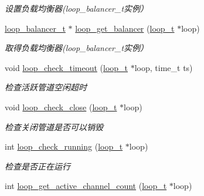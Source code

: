 \begin{DoxyCompactItemize}
\begin{DoxyCompactList}\small\item\em 设置负载均衡器(loop\+\_\+balancer\+\_\+t实例） \end{DoxyCompactList}\item 
\hyperlink{a00051_a649c7e850ab247b5f70ad27e335a129d_a649c7e850ab247b5f70ad27e335a129d}{loop\+\_\+balancer\+\_\+t} $\ast$ \hyperlink{a00069_a1f9df6866c80e91a620320298d199315_a1f9df6866c80e91a620320298d199315}{loop\+\_\+get\+\_\+balancer} (\hyperlink{a00051_a9c3ad1cd2de83e09f3a7b59fa82c94ee_a9c3ad1cd2de83e09f3a7b59fa82c94ee}{loop\+\_\+t} $\ast$loop)
\begin{DoxyCompactList}\small\item\em 取得负载均衡器(loop\+\_\+balancer\+\_\+t实例） \end{DoxyCompactList}\item 
void \hyperlink{a00069_a7a6972b39402a670659621e9fa7204ce_a7a6972b39402a670659621e9fa7204ce}{loop\+\_\+check\+\_\+timeout} (\hyperlink{a00051_a9c3ad1cd2de83e09f3a7b59fa82c94ee_a9c3ad1cd2de83e09f3a7b59fa82c94ee}{loop\+\_\+t} $\ast$loop, time\+\_\+t ts)
\begin{DoxyCompactList}\small\item\em 检查活跃管道空闲超时 \end{DoxyCompactList}\item 
void \hyperlink{a00069_a5f61cefa251961e82fbf82b1c7dc0b6b_a5f61cefa251961e82fbf82b1c7dc0b6b}{loop\+\_\+check\+\_\+close} (\hyperlink{a00051_a9c3ad1cd2de83e09f3a7b59fa82c94ee_a9c3ad1cd2de83e09f3a7b59fa82c94ee}{loop\+\_\+t} $\ast$loop)
\begin{DoxyCompactList}\small\item\em 检查关闭管道是否可以销毁 \end{DoxyCompactList}\item 
int \hyperlink{a00069_a841de68dad67aba3b98d2c55d2891521_a841de68dad67aba3b98d2c55d2891521}{loop\+\_\+check\+\_\+running} (\hyperlink{a00051_a9c3ad1cd2de83e09f3a7b59fa82c94ee_a9c3ad1cd2de83e09f3a7b59fa82c94ee}{loop\+\_\+t} $\ast$loop)
\begin{DoxyCompactList}\small\item\em 检查是否正在运行 \end{DoxyCompactList}\item 
int \hyperlink{a00105_ga6fa8f99fdc7a036fea6ca91971885e52_ga6fa8f99fdc7a036fea6ca91971885e52}{loop\+\_\+get\+\_\+active\+\_\+channel\+\_\+count} (\hyperlink{a00051_a9c3ad1cd2de83e09f3a7b59fa82c94ee_a9c3ad1cd2de83e09f3a7b59fa82c94ee}{loop\+\_\+t} $\ast$loop)

\end{DoxyCompactItemize}

